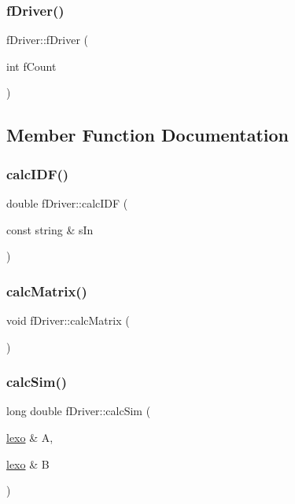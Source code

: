 \subsubsection{\texorpdfstring{f\+Driver()}{fDriver()}}
{\footnotesize\ttfamily f\+Driver\+::f\+Driver (\begin{DoxyParamCaption}\item[{int}]{f\+Count }\end{DoxyParamCaption})\hspace{0.3cm}{\ttfamily [inline]}}



\subsection{Member Function Documentation}
\mbox{\label{classf_driver_aaddb40ecbf0340639b751ed266d4d6f4}} 
\subsubsection{\texorpdfstring{calc\+I\+D\+F()}{calcIDF()}}
{\footnotesize\ttfamily double f\+Driver\+::calc\+I\+DF (\begin{DoxyParamCaption}\item[{const string \&}]{s\+In }\end{DoxyParamCaption})}

\mbox{\label{classf_driver_afe5f65a9ff4b8a45c511c76fedcdd351}} 
\subsubsection{\texorpdfstring{calc\+Matrix()}{calcMatrix()}}
{\footnotesize\ttfamily void f\+Driver\+::calc\+Matrix (\begin{DoxyParamCaption}{ }\end{DoxyParamCaption})}

\mbox{\label{classf_driver_ad65711cd54645b076ea7cda7d841bea8}} 
\subsubsection{\texorpdfstring{calc\+Sim()}{calcSim()}}
{\footnotesize\ttfamily long double f\+Driver\+::calc\+Sim (\begin{DoxyParamCaption}\item[{\hyperlink{classlexo}{lexo} \&}]{A,  }\item[{\hyperlink{classlexo}{lexo} \&}]{B }\end{DoxyParamCaption})}

